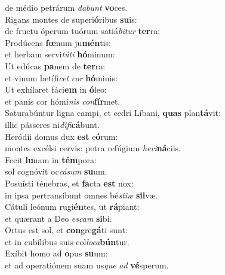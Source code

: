 \oddverse de médio petrárum \textit{da}\textit{bunt} \textbf{vo}ces.\\
\evenverse Rigans montes de superi\textbf{ó}ribus \textbf{su}is:~\*\\
\evenverse de fructu óperum tuórum satiá\textit{bi}\textit{tur} \textbf{ter}ra:\\
\oddverse Prodúcens \textbf{fœ}num ju\textbf{mén}tis:~\*\\
\oddverse et herbam servi\textit{tú}\textit{ti} \textbf{hó}minum:\\
\evenverse Ut edúcas \textbf{pa}nem de \textbf{ter}ra:~\*\\
\evenverse et vinum lætífi\textit{cet} \textit{cor} \textbf{hó}minis:\\
\oddverse Ut exhílaret fáci\textbf{em} in \textbf{ó}leo:~\*\\
\oddverse et panis cor hómi\textit{nis} \textit{con}\textbf{fír}met.\\
\evenverse Saturabúntur ligna campi, et cedri Líbani, \textbf{quas} plan\textbf{tá}vit:~\*\\
\evenverse illic pásseres ni\textit{di}\textit{fi}\textbf{cá}bunt.\\
\oddverse Heródii domus dux \textbf{est} e\textbf{ó}rum:~\*\\
\oddverse montes excélsi cervis: petra refúgium \textit{he}\textit{ri}\textbf{ná}ciis.\\
\evenverse Fecit \textbf{lu}nam in \textbf{tém}pora:~\*\\
\evenverse sol cognóvit oc\textit{cá}\textit{sum} \textbf{su}um.\\
\oddverse Posuísti ténebras, et \textbf{fa}cta \textbf{est} nox:~\*\\
\oddverse in ipsa pertransíbunt omnes bé\textit{sti}\textit{æ} \textbf{sil}væ.\\
\evenverse Cátuli leónum rugi\textbf{én}tes, ut \textbf{rá}piant:~\*\\
\evenverse et quærant a Deo \textit{e}\textit{scam} \textbf{si}bi.\\
\oddverse Ortus est sol, et \textbf{con}gre\textbf{gá}ti sunt:~\*\\
\oddverse et in cubílibus suis col\textit{lo}\textit{ca}\textbf{bún}tur.\\
\evenverse Exíbit homo ad \textbf{o}pus \textbf{su}um:~\*\\
\evenverse et ad operatiónem suam us\textit{que} \textit{ad} \textbf{vé}sperum.\\
